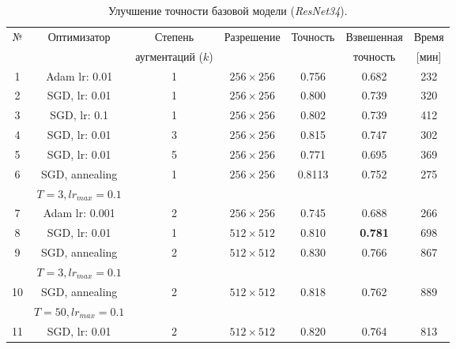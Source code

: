 \begin{table}[h!]
    \begin{center}
        \begin{tabular}{c | c| c | c | c| c| c}
            \hline
           № & Оптимизатор & Степень & Разрешение & Точность & Взвешенная  & Время \\
            & & аугментаций ($k$) & & & точность & [мин] \\
           \hline
    
           1 & Adam lr: 0.01 & 1 & $256 \times 256$ & 0.756 & 0.682 & 232 \\
           
           2 & SGD, lr: 0.01 & 1 & $256 \times 256$ & 0.800 & 0.739 & 320 \\
           
           3 & SGD, lr: 0.1 & 1 & $256 \times 256$ & 0.802 & 0.739 & 412 \\
           
           4 & SGD, lr: 0.01 & 3 & $256 \times 256$ & 0.815 & 0.747 & 302 \\
           
           5 & SGD, lr: 0.01 & 5 & $256 \times 256$ & 0.771 & 0.695 & 369 \\
           
           \hline
           6 & SGD, annealing & 1 & $256 \times 256$ & 0.8113 & 0.752 & 275 \\
            &  $T=3, lr_{max} = 0.1$ & & & & \\
           \hline
            
           7 & Adam lr: 0.001 & 2 & $256 \times 256$ & 0.745 & 0.688 & 266 \\
            
           8 & SGD, lr: 0.01 & 1 & $512 \times 512$ & 0.810 & \textbf{0.781} & 698 \\
           
           \hline
           9 & SGD, annealing & 2 & $512 \times 512$ & 0.830 & 0.766 & 867 \\
            &  $T=3, lr_{max} = 0.1$ & & & & \\
           \hline
           
           10 & SGD, annealing & 2 & $512 \times 512$ & 0.818 & 0.762 & 889 \\
            &  $T=50, lr_{max} = 0.1$ & & & & \\
           \hline
           
           11 & SGD, lr: 0.01 & 2 & $512 \times 512$ & 0.820 & 0.764 & 813 \\
           
            \hline
        \end{tabular}
    \end{center}
    \caption{Улучшение точности базовой модели (\textit{ResNet34}).}
    \label{tabular: train_tricks}
\end{table}


